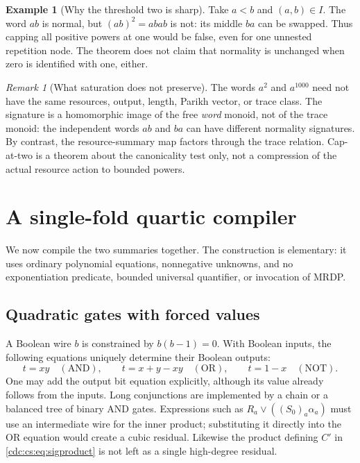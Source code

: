 \documentclass[11pt,a4paper]{article}
\theoremstyle{definition}
\newtheorem{example}[example]{Example}
\theoremstyle{remark}
\newtheorem{remark}[remark]{Remark}
\newcommand{\srctag}[1]{\texorpdfstring{\hspace{0.5em}{\normalfont\small\color{accent}[#1]}}{ [#1]}}
\begin{document}
\begin{example}[Why the threshold two is sharp]
Take $a<b$ and $(a,b)\in I$. The word $ab$ is normal, but $(ab)^2=abab$ is not:
its middle $ba$ can be swapped. Thus capping all positive powers at one would
be false, even for one unnested repetition node. The theorem does not claim
that normality is unchanged when zero is identified with one, either.
\end{example}

\begin{remark}[What saturation does not preserve]
The words $a^2$ and $a^{1000}$ need not have the same resources, output,
length, Parikh vector, or trace class. The signature is a homomorphic image
of the free \emph{word} monoid, not of the trace monoid: the independent words
$ab$ and $ba$ can have different normality signatures. By contrast, the
resource-summary map factors through the trace relation. Cap-at-two is a
theorem about the canonicality test only, not a compression of the actual
resource action to bounded powers.
\end{remark}

\section{A single-fold quartic compiler\srctag{06}}
\label{cdc:cs:sec:compiler}

We now compile the two summaries together. The construction is elementary:
it uses ordinary polynomial equations, nonnegative unknowns, and no
exponentiation predicate, bounded universal quantifier, or invocation of
MRDP.

\subsection{Quadratic gates with forced values}

A Boolean wire $b$ is constrained by $b(b-1)=0$. With Boolean inputs, the
following equations uniquely determine their Boolean outputs:
\begin{equation}
\label{cdc:cs:eq:booleangates}
t=xy\quad(\mathrm{AND}),\qquad
 t=x+y-xy\quad(\mathrm{OR}),\qquad
 t=1-x\quad(\mathrm{NOT}).
\end{equation}
One may add the output bit equation explicitly, although its value already
follows from the inputs. Long conjunctions are implemented by a chain or a
balanced tree of binary AND gates. Expressions such as
$R_a\lor((S_0)_a\alpha_a)$ must use an intermediate wire for the inner
product; substituting it directly into the OR equation would create a cubic
residual. Likewise the product defining $C'$ in \eqref{cdc:cs:eq:sigproduct} is not
left as a single high-degree residual.
\end{document}
